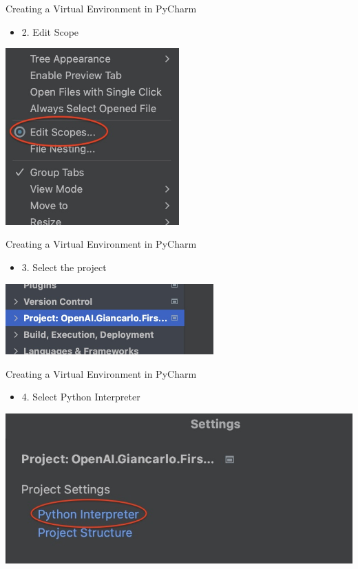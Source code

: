 \documentclass{beamer}
\begin{document}
\begin{frame}
{\centerline{Creating a Virtual Environment in PyCharm}}
\begin{itemize}
    \item 2. Edit Scope
\end{itemize} 
\begin{center}
    \includegraphics[width=0.5\textwidth]{Coding/PyCharm.EditScope.jpg}
\end{center}
\end{frame}

\begin{frame}
{\centerline{Creating a Virtual Environment in PyCharm}}
\begin{itemize}
    \item 3. Select the project
\end{itemize} 
\begin{center}
    \includegraphics[width=0.6\textwidth]{Coding/PyCharm.Project.jpg}
\end{center}
\end{frame}

\begin{frame}
{\centerline{Creating a Virtual Environment in PyCharm}}
\begin{itemize}
    \item 4. Select Python Interpreter
\end{itemize} 
\begin{center}
    \includegraphics[width=\textwidth]{Coding/PyCharm.PhytonInterpreter.jpg}
\end{center}
\end{frame}
\end{document}
